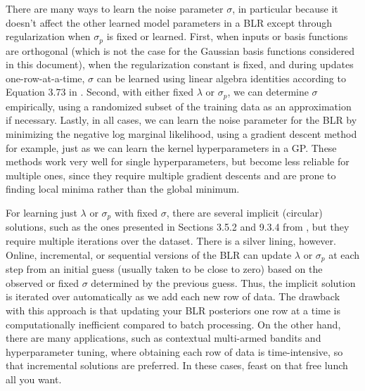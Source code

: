 \documentclass{article}
\begin{document}
There are many ways to learn the noise parameter $\sigma$, in particular because it doesn't affect the other learned model parameters in a BLR except through regularization when $\sigma_p$ is fixed or learned. First, when inputs or basis functions are orthogonal (which is not the case for the Gaussian basis functions considered in this document), when the regularization constant is fixed, and during updates one-row-at-a-time, $\sigma$ can be learned using linear algebra identities according to Equation 3.73 in \cite{murphy}. Second, with either fixed $\lambda$ or $\sigma_p$, we can determine $\sigma$ empirically, using a randomized subset of the training data as an approximation if necessary. Lastly, in all cases, we can learn the noise parameter for the BLR by minimizing the negative log marginal likelihood, using a gradient descent method for example, just as we can learn the kernel hyperparameters in a GP. These methods work very well for single hyperparameters, but become less reliable for multiple ones, since they require multiple gradient descents and are prone to finding local minima rather than the global minimum.

For learning just $\lambda$ or $\sigma_p$ with fixed $\sigma$, there are several implicit (circular) solutions, such as the ones presented in Sections 3.5.2 and 9.3.4 from \cite{bishop}, but they require multiple iterations over the dataset. There is a silver lining, however. Online, incremental, or sequential versions of the BLR can update $\lambda$ or $\sigma_p$ at each step from an initial guess (usually taken to be close to zero) based on the observed or fixed $\sigma$ determined by the previous guess. Thus, the implicit solution is iterated over automatically as we add each new row of data. The drawback with this approach is that updating your BLR posteriors one row at a time is computationally inefficient compared to batch processing. On the other hand, there are many applications, such as contextual multi-armed bandits and hyperparameter tuning, where obtaining each row of data is time-intensive, so that incremental solutions are preferred. In these cases, feast on that free lunch all you want.

\printbibliography
\end{document}
